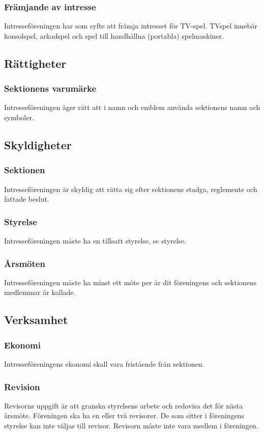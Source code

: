 \documentclass[11pt, noincludeaddress]{classes/cthit}
\begin{document}
\subsubsection{Främjande av intresse}
Intresseföreningen har som syfte att främja intresset för TV-spel. TVspel innebär konsolspel, arkadspel och spel till handhållna (portabla) spelmaskiner.

\subsection{Rättigheter}
\subsubsection{Sektionens varumärke}
Intresseföreningen äger rätt att i namn och emblem använda
sektionens namn och symboler.


\subsection{Skyldigheter}

\subsubsection{Sektionen}
Intresseföreningen är skyldig att rätta sig efter sektionens stadga, 
reglemente och fattade beslut. 

\subsubsection{Styrelse}
Intresseföreningen måste ha en tillsatt styrelse, se {styrelse}.

\subsubsection{Årsmöten}
Intresseföreningen måste ha minst ett möte per år dit föreningens 
och sektionens medlemmar är kallade.

\subsection{Verksamhet}
\subsubsection{Ekonomi}
Intresseföreningens ekonomi skall vara fristående från sektionen.
\subsubsection{Revision}
Revisorns uppgift är att granska styrelsens arbete och redovisa det för nästa årsmöte.
Föreningen ska ha en eller två revisorer.
De som sitter i föreningens styrelse kan inte väljas till revisor.
Revisorn måste inte vara medlem i föreningen.
\end{document}
